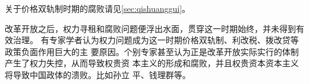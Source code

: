 关于价格双轨制时期的腐败请见\cref{sec:qishuanggui}。


改革开放之后，权力寻租和腐败问题便浮出水面，贯穿这一时期始终，并未得到有效治理。
有专家学者认为权力问题成为这一时期价格双轨制、利改税、拨改贷等政策负面作用巨大的主
要原因。个别专家甚至认为正是改革开放实际实行的体制产生了权力失控，从而导致权贵资
本主义的形成和腐败，并且权贵资本资本主义将导致中国政体的溃败。比如孙立
平\cite{sunlipingkuibai}、钱理群\cite{maohehoumao2}等。















